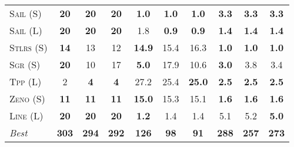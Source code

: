 \documentclass[11pt]{article}
\begin{document}
\begin{table*}[tb]
{\begin{tabular}{|l||ccc||ccc||ccc||}
\textsc{Sail} (S)&\textbf{20}&\textbf{20}&\textbf{20}&\textbf{1.0}&\textbf{1.0}&\textbf{1.0}&\textbf{3.3}&\textbf{3.3}&\textbf{3.3}\\
\textsc{Sail} (L)&\textbf{20}&\textbf{20}&\textbf{20}&1.8&\textbf{0.9}&\textbf{0.9}&\textbf{1.4}&\textbf{1.4}&\textbf{1.4}\\
\textsc{Stlrs} (S)&\textbf{14}&13&12&\textbf{14.9}&15.4&16.3&\textbf{1.0}&\textbf{1.0}&\textbf{1.0}\\
\textsc{Sgr} (S)&\textbf{20}&10&17&\textbf{5.0}&17.9&10.6&\textbf{3.0}&3.8&3.4\\
\textsc{Tpp} (L)&2&\textbf{4}&\textbf{4}&27.2&25.4&\textbf{25.0}&\textbf{2.5}&\textbf{2.5}&\textbf{2.5}\\
\textsc{Zeno} (S)&\textbf{11}&\textbf{11}&\textbf{11}&\textbf{15.0}&15.3&15.1&\textbf{1.6}&\textbf{1.6}&\textbf{1.6}\\
\textsc{Line} (L)&\textbf{20}&\textbf{20}&\textbf{20}&\textbf{1.2}&1.4&1.4&5.1&5.2&\textbf{5.0}
\\\hline
\textit{Best}&\textbf{303}&\textbf{294}&\textbf{292}&\textbf{126}&\textbf{98}&\textbf{91}&\textbf{288}&\textbf{257}&\textbf{273}\\\hline

        \end{tabular}}
        \caption{}
        \label{tab:all-patty}
        \end{table*}
        
\end{document}

